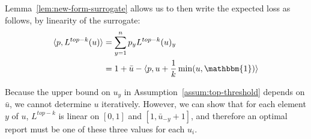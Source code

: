 \documentclass[12pt]{article}
\newcommand{\Comments}{1}
\newcommand{\mynote}[2]{\ifnum\Comments=1\textcolor{#1}{#2}\fi}
\newcommand{\jessie}[1]{\mynote{purple}{[JF: #1]}}
\newcommand{\ubar}{\bar{u}}
\newcommand{\inprod}[2]{\langle #1, #2 \rangle}%
\newcommand{\ones}{\mathbbm{1}}
\begin{document}

Lemma~\ref{lem:new-form-surrogate} allows us to then write the expected loss as follows, by linearity of the surrogate:
\begin{align*}
\inprod{p}{L^{top-k}(u)} &= \sum_{y=1}^n p_y L^{top-k}(u)_y \\
&= 1 + \ubar - \inprod{p}{u + \frac 1 k \min(u, \ones)}
\end{align*}

%
%
Because the upper bound on $u_y$ in Assumption~\ref{assum:top-threshold} depends on $\ubar$, we cannot determine $u$ iteratively.
However, we can show that for each element $y$ of $u$, $L^{top-k}$ is linear on $[0,1]$ and $[1, \bar u_{-y} + 1]$, and therefore an optimal report must be one of these three values for each $u_i$.
\end{document}
